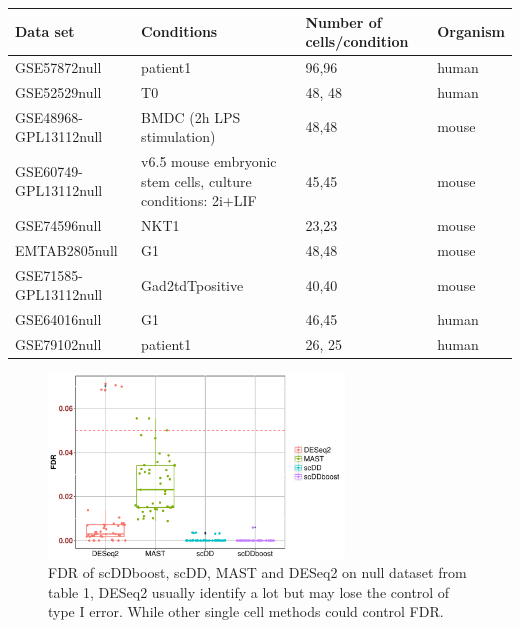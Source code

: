 \documentclass[aoas,preprint]{imsart}
\begin{document}
\begin{table}[ht]
\footnotesize
\centering
\begin{tabular}{ |p{3cm}|p{5cm}|p{3cm}|p{2cm}|}
\hline
 Data set & Conditions & Number of cells/condition & Organism \\
\hline
\hline
GSE57872null & patient1 & 96,96 & human \\
\hline
GSE52529null & T0 & 48, 48 & human \\
\hline
GSE48968-GPL13112null & BMDC (2h LPS stimulation) & 48,48 & mouse \\
\hline
 GSE60749-GPL13112null & v6.5 mouse embryonic stem cells, culture conditions: 2i+LIF & 45,45 & mouse \\
 \hline
 GSE74596null & NKT1 & 23,23 & mouse\\
 \hline
 EMTAB2805null & G1 & 48,48 & mouse\\
 \hline
GSE71585-GPL13112null &Gad2tdTpositive  & 40,40 & mouse \\
\hline
GSE64016null & G1 & 46,45 & human \\
\hline
GSE79102null & patient1 & 26, 25 & human\\
\hline
\end{tabular}
\end{table}


\begin{figure}[H]
\includegraphics[width = 0.7\textwidth]{Figs/fdr.pdf}
 \caption{FDR of scDDboost, scDD, MAST and DESeq2 on null dataset from table 1, DESeq2 usually identify a lot but may lose the control of type I error. While other single cell methods could control FDR. }
  \label{fig:7}
\end{figure}
\end{document}
